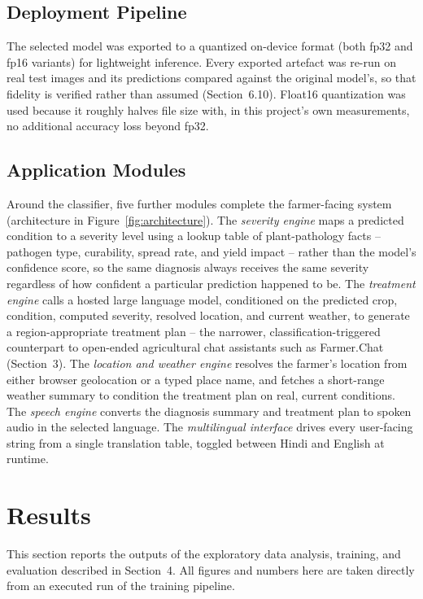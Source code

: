 \documentclass[12pt,a4paper]{article}
\begin{document}
\subsection{Deployment Pipeline}
The selected model was exported to a quantized on-device format (both fp32
and fp16 variants) for lightweight inference. Every exported artefact was
re-run on real test images and its predictions compared against the
original model's, so that fidelity is verified rather than assumed
(Section~6.10). Float16 quantization was used because it roughly halves file
size with, in this project's own measurements, no additional accuracy loss
beyond fp32.

\subsection{Application Modules}
Around the classifier, five further modules complete the farmer-facing
system (architecture in Figure~\ref{fig:architecture}). The
\textit{severity engine} maps a predicted condition to a severity level using
a lookup table of plant-pathology facts -- pathogen type, curability, spread
rate, and yield impact -- rather than the model's confidence score, so the
same diagnosis always receives the same severity regardless of how confident
a particular prediction happened to be. The \textit{treatment engine} calls a
hosted large language model, conditioned on the predicted crop, condition,
computed severity, resolved location, and current weather, to generate a
region-appropriate treatment plan -- the narrower, classification-triggered
counterpart to open-ended agricultural chat assistants such as Farmer.Chat
\cite{singh2024farmerchat} (Section~3). The \textit{location and weather
engine} resolves the farmer's location from either browser geolocation or a
typed place name, and fetches a short-range weather summary to condition the
treatment plan on real, current conditions. The \textit{speech engine}
converts the diagnosis summary and treatment plan to spoken audio in the
selected language. The \textit{multilingual interface} drives every
user-facing string from a single translation table, toggled between Hindi
and English at runtime.

\section{Results}
This section reports the outputs of the exploratory data analysis, training,
and evaluation described in Section~4. All figures and numbers here are taken
directly from an executed run of the training pipeline.
\end{document}
